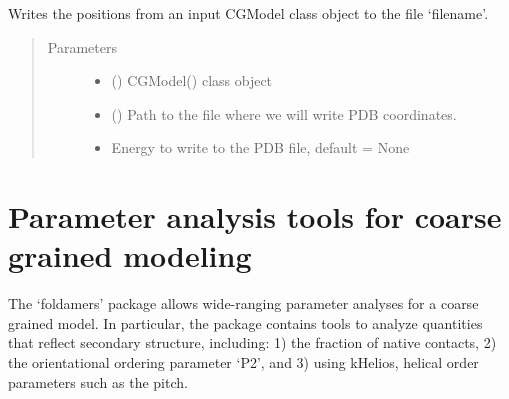 \documentclass[letterpaper,12pt,english,openany,oneside]{sphinxmanual}
\begin{document}
\begin{fulllineitems}
\label{\detokenize{utilities:utilities.iotools.write_pdbfile_without_topology}}
Writes the positions from an input CGModel class object to the file ‘filename’.
\begin{quote}\begin{description}
\item[{Parameters}] \leavevmode\begin{itemize}
\item {} 
 () \textendash{} CGModel() class object

\item {} 
 () \textendash{} Path to the file where we will write PDB coordinates.

\item {} 
 \textendash{} Energy to write to the PDB file, default = None

\end{itemize}

\end{description}\end{quote}

\end{fulllineitems}



\chapter{Parameter analysis tools for coarse grained modeling}
\label{\detokenize{parameters:parameter-analysis-tools-for-coarse-grained-modeling}}\label{\detokenize{parameters::doc}}
The ‘foldamers’ package allows wide-ranging parameter analyses for a coarse grained model.  In particular, the package contains tools to analyze quantities that reflect secondary structure, including: 1) the fraction of native contacts, 2) the orientational ordering parameter ‘P2’, and 3) using kHelios, helical order parameters such as the pitch.

\label{\detokenize{parameters:module-parameters.secondary_structure}}
\end{document}

